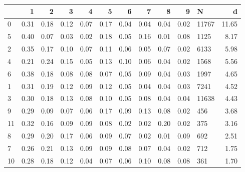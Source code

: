 \begin{tabular}{lrrrrrrrrrlr}
\toprule
{} &    1 &    2 &    3 &    4 &    5 &    6 &    7 &    8 &    9 &      N &     d \\
\midrule
0  & 0.31 & 0.18 & 0.12 & 0.07 & 0.17 & 0.04 & 0.04 & 0.04 & 0.02 &  11767 & 11.65 \\
5  & 0.40 & 0.07 & 0.03 & 0.02 & 0.18 & 0.05 & 0.16 & 0.01 & 0.08 &   1125 &  8.17 \\
2  & 0.35 & 0.17 & 0.10 & 0.07 & 0.11 & 0.06 & 0.05 & 0.07 & 0.02 &   6133 &  5.98 \\
4  & 0.21 & 0.24 & 0.15 & 0.05 & 0.13 & 0.10 & 0.06 & 0.04 & 0.02 &   1568 &  5.56 \\
6  & 0.38 & 0.18 & 0.08 & 0.08 & 0.07 & 0.05 & 0.09 & 0.04 & 0.03 &   1997 &  4.65 \\
1  & 0.31 & 0.19 & 0.12 & 0.09 & 0.12 & 0.05 & 0.04 & 0.04 & 0.03 &   7241 &  4.52 \\
3  & 0.30 & 0.18 & 0.13 & 0.08 & 0.10 & 0.05 & 0.08 & 0.04 & 0.04 &  11638 &  4.43 \\
9  & 0.29 & 0.09 & 0.07 & 0.06 & 0.17 & 0.09 & 0.13 & 0.08 & 0.02 &    456 &  3.68 \\
11 & 0.32 & 0.16 & 0.09 & 0.09 & 0.08 & 0.02 & 0.02 & 0.20 & 0.02 &    375 &  3.16 \\
8  & 0.29 & 0.20 & 0.17 & 0.06 & 0.09 & 0.07 & 0.02 & 0.01 & 0.09 &    692 &  2.51 \\
7  & 0.26 & 0.21 & 0.13 & 0.09 & 0.09 & 0.08 & 0.07 & 0.04 & 0.02 &    712 &  1.75 \\
10 & 0.28 & 0.18 & 0.12 & 0.04 & 0.07 & 0.06 & 0.10 & 0.08 & 0.08 &    361 &  1.70 \\
\bottomrule
\end{tabular}
